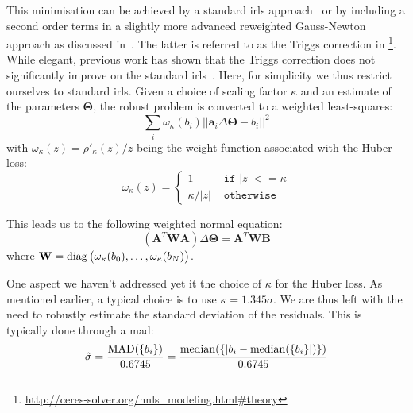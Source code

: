 This minimisation can be achieved by a standard \gls{irls} approach~\cite{Green:JRSSB:1984} or by including a second order terms in a slightly more advanced reweighted Gauss-Newton approach as discussed in~\cite{Triggs:VisAlg:2000}.
The latter is referred to as the Triggs correction in \footnote{\url{http://ceres-solver.org/nnls_modeling.html\#theory}}. While elegant, previous work has shown that the Triggs correction does not significantly improve on the standard \gls{irls}~\cite{Zach:ECCV:2014,Zach:ECCV:2018}.
Here, for simplicity we thus restrict ourselves to standard \gls{irls}.
Given a choice of scaling factor $\kappa$ and an estimate of the parameters $\mathbf{\Theta}$, the robust problem is converted to a weighted least-squares:
\begin{equation}
\sum_i \omega_\kappa(b_i) ||\mathbf{a}_i \Delta\mathbf{\Theta} - b_i||^2
\end{equation}
with $\omega_\kappa(z) = \rho'_\kappa(z) / z$ being the weight function associated with the Huber loss:
\begin{equation}
\omega_\kappa(z) =
\begin{cases}
  1 &\texttt{ if } |z| <= \kappa \\
  \kappa / |z|  &\texttt{ otherwise }
\end{cases}
\end{equation}

This leads us to the following weighted normal equation:
\begin{equation}
(\mathbf{A}^T \mathbf{W} \mathbf{A}) \Delta\mathbf{\Theta} = \mathbf{A}^T \mathbf{W} \mathbf{B}
\end{equation}
where $\mathbf{W} = \operatorname{diag}\big(\omega_\kappa(b_0), \ldots, \omega_\kappa(b_N)\big)$.

One aspect we haven't addressed yet it the choice of $\kappa$ for the Huber loss. As mentioned earlier, a typical choice is to use $\kappa=1.345\sigma$. We are thus left with the need to robustly estimate the standard deviation of the residuals. This is typically done through a \gls{mad}:
\begin{equation}
\hat{\sigma} = \frac{\operatorname{MAD}(\{b_i\})}{0.6745} = \frac{\operatorname{median}(\{|b_i-\operatorname{median}(\{b_i\}|)\})}{0.6745}
\end{equation}

